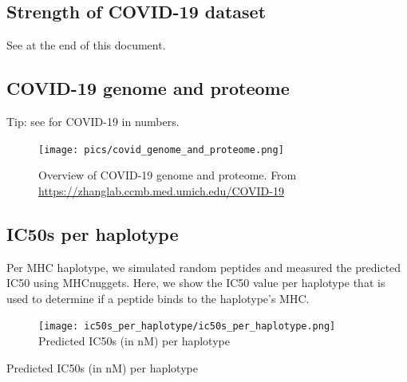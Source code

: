 \subsection{Strength of COVID-19 dataset}

See at the end of this document.

\subsection{COVID-19 genome and proteome}

Tip: see \cite{bar2020sars} for COVID-19 in numbers.


\begin{figure}[!htbp]
  \texttt{[image: pics/covid\_genome\_and\_proteome.png]}
  \caption{
    Overview of COVID-19 genome and proteome.
    From 
    \url{https://zhanglab.ccmb.med.umich.edu/COVID-19}
  }
  \label{fig:covid_genome_and_proteome}
\end{figure}

\subsection{IC50s per haplotype}

Per MHC haplotype, we simulated random peptides and measured the
predicted IC50 using MHCnuggets. 
Here, we show the IC50 value per haplotype that
is used to determine if a peptide binds to the haplotype's MHC.

\begin{figure}[!htbp]
  \texttt{[image: ic50s\_per\_haplotype/ic50s\_per\_haplotype.png]}
  Predicted IC50s (in nM) per haplotype
  \caption{
  }
  \label{fig:ic50s_per_haplotype}
\end{figure}


\begin{table}[!htbp]
  
  \caption{
    Predicted IC50s (in nM) per haplotype
  }
  \label{table:ic50s_per_haplotype}
\end{table}

